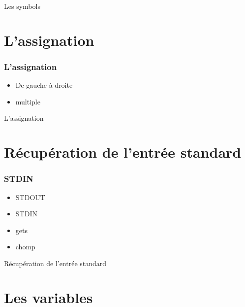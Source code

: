 \documentclass{beamer}
\begin{document}
\begin{frame}
  \begin{beamerboxesrounded}{Les symbols}
    
  \end{beamerboxesrounded}
\end{frame}


\section{L'assignation}

\begin{frame}
  \frametitle{L'assignation}
  \begin{itemize}
    \item De gauche à droite
    \item multiple
  \end{itemize}
\end{frame}

\begin{frame}
  \begin{beamerboxesrounded}{L'assignation}
    
  \end{beamerboxesrounded}
\end{frame}

\section{Récupération de l'entrée standard}

\begin{frame}
  \frametitle{STDIN}
  \begin{itemize}
    \item STDOUT
    \item STDIN
    \item gets
    \item chomp
  \end{itemize}
\end{frame}

\begin{frame}
  \begin{beamerboxesrounded}{R\'ecup\'eration de l'entr\'ee standard}
    
  \end{beamerboxesrounded}
\end{frame}

\section{Les variables}
\end{document}
